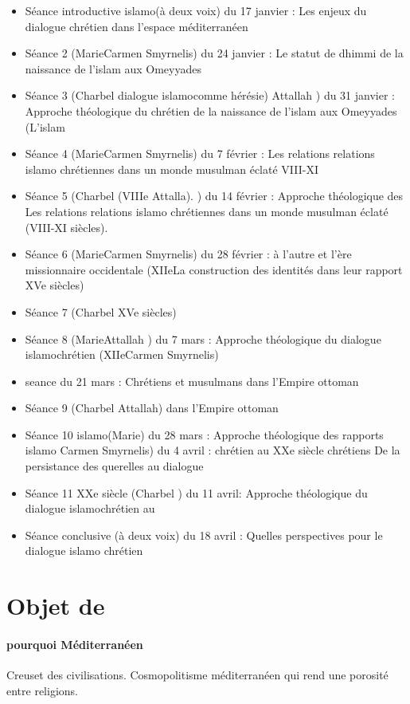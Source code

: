 \begin{itemize}
    \item Séance introductive islamo(à deux voix) du 17 janvier : Les enjeux du dialogue chrétien dans l’espace méditerranéen     \item Séance 2 (MarieCarmen Smyrnelis) du 24 janvier : Le statut de dhimmi de la naissance de l’islam aux Omeyyades     \item Séance 3 (Charbel dialogue islamocomme hérésie) Attallah ) du 31 janvier : Approche théologique du chrétien de la naissance de l’islam aux Omeyyades (L’islam     \item Séance 4 (MarieCarmen Smyrnelis) du 7 février : Les relations relations islamo chrétiennes  dans  un monde musulman éclaté   VIII-XI \item  Séance 5 (Charbel (VIIIe Attalla). ) du 14 février : Approche théologique des Les relations relations islamo chrétiennes  dans  un monde musulman éclaté  (VIII-XI  siècles).

    \item Séance 6 (MarieCarmen Smyrnelis) du 28 février : à l’autre et l’ère missionnaire occidentale (XIIeLa construction des identités dans leur rapport XVe siècles) \item Séance 7 (Charbel XVe siècles) \item Séance 8 (MarieAttallah ) du 7 mars : Approche théologique du dialogue islamochrétien (XIIeCarmen Smyrnelis) \item seance du 21 mars : Chrétiens et musulmans dans l’Empire ottoman  \item Séance 9 (Charbel Attallah) dans l’Empire ottoman \item Séance 10 islamo(Marie) du 28 mars : Approche théologique des rapports islamo Carmen Smyrnelis) du 4 avril : chrétien au XXe siècle chrétiens De la persistance des querelles au dialogue \item Séance 11 XXe siècle (Charbel ) du 11 avril: Approche théologique du dialogue islamochrétien au \item Séance conclusive  (à deux voix) du 18 avril : Quelles perspectives pour le dialogue islamo chrétien 
\end{itemize}

\section{Objet de \Med}
\paragraph{pourquoi Méditerranéen} Creuset des civilisations. Cosmopolitisme méditerranéen qui rend une porosité entre religions.


